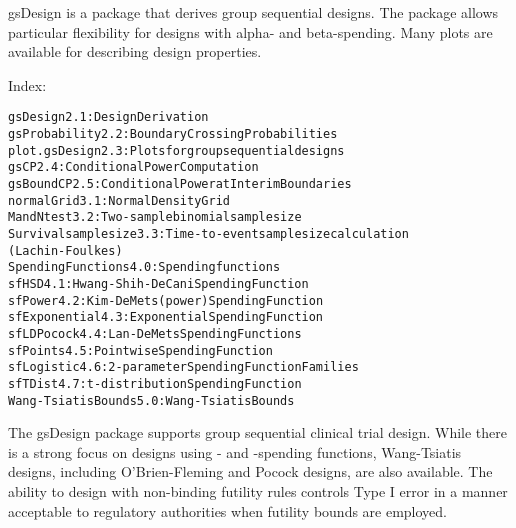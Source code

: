 \begin{Description}\relax
gsDesign is a package that derives group sequential designs.
The package allows particular flexibility for designs with alpha- and beta-spending.
Many plots are available for describing design properties.
\end{Description}
\begin{Details}\relax
{}

Index:
\begin{alltt}
gsDesign                2.1: Design Derivation
gsProbability           2.2: Boundary Crossing Probabilities
plot.gsDesign           2.3: Plots for group sequential designs
gsCP                    2.4: Conditional Power Computation
gsBoundCP               2.5: Conditional Power at Interim Boundaries
normalGrid              3.1: Normal Density Grid
MandNtest               3.2: Two-sample binomial sample size
Survival sample size    3.3: Time-to-event sample size calculation
                        (Lachin-Foulkes)
Spending Functions      4.0: Spending functions
sfHSD                   4.1: Hwang-Shih-DeCani Spending Function
sfPower                 4.2: Kim-DeMets (power) Spending Function
sfExponential           4.3: Exponential Spending Function
sfLDPocock              4.4: Lan-DeMets Spending Functions
sfPoints                4.5: Pointwise Spending Function
sfLogistic              4.6: 2-parameter Spending Function Families
sfTDist                 4.7: t-distribution Spending Function
Wang-Tsiatis Bounds     5.0: Wang-Tsiatis Bounds
\end{alltt}
The gsDesign package supports group sequential clinical trial design. 
While there is a strong focus on designs using - and -spending functions, Wang-Tsiatis designs, 
including O'Brien-Fleming and Pocock designs, are also available.
The ability to design with non-binding futility rules 
controls Type I error in a manner acceptable to regulatory authorities when futility bounds are employed. 


\end{Details}
